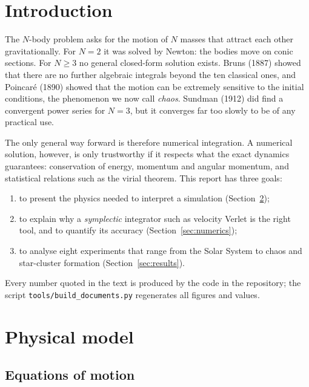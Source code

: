 \documentclass[11pt,a4paper]{article}
\begin{document}
\tableofcontents
\newpage

\section{Introduction}

The $N$-body problem asks for the motion of $N$ masses that attract each other
gravitationally. For $N=2$ it was solved by Newton: the bodies move on conic sections.
For $N\ge 3$ no general closed-form solution exists. Bruns (1887) showed that there are
no further algebraic integrals beyond the ten classical ones, and Poincaré (1890)
showed that the motion can be extremely sensitive to the initial conditions, the
phenomenon we now call \emph{chaos}. Sundman (1912) did find a convergent power series
for $N=3$, but it converges far too slowly to be of any practical use.

The only general way forward is therefore numerical integration. A numerical solution,
however, is only trustworthy if it respects what the exact dynamics guarantees:
conservation of energy, momentum and angular momentum, and statistical relations such as
the virial theorem. This report has three goals:
\begin{enumerate}
  \item to present the physics needed to interpret a simulation (Section~\ref{sec:model});
  \item to explain why a \emph{symplectic} integrator such as velocity Verlet is the
        right tool, and to quantify its accuracy (Section~\ref{sec:numerics});
  \item to analyse eight experiments that range from the Solar System to chaos and
        star-cluster formation (Section~\ref{sec:results}).
\end{enumerate}
Every number quoted in the text is produced by the code in the repository; the script
\texttt{tools/build\_documents.py} regenerates all figures and values.

\section{Physical model}\label{sec:model}

\subsection{Equations of motion}
\end{document}

